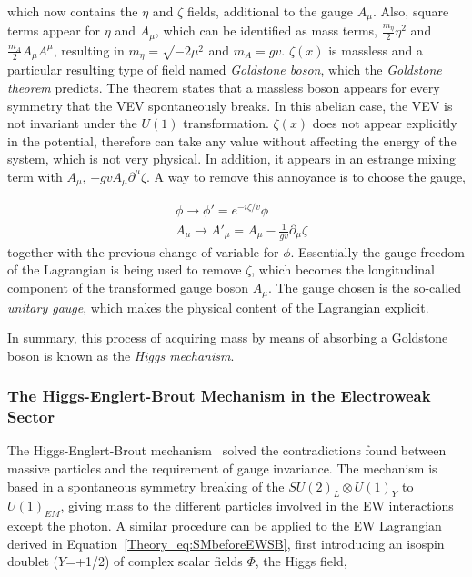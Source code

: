 which now contains the $\eta$ and $\zeta$ fields, additional to the gauge $A_\mu$. Also, square terms appear for $\eta$ and $A_\mu$, which can be identified as mass terms, $\frac{m_\eta}{2}\eta^2$ and $\frac{m_A}{2}A_\mu A^\mu$, resulting in $m_\eta=\sqrt{-2\mu^2}$ and $m_A=gv$. $\zeta(x)$ is massless and a particular resulting type of field named \textit{Goldstone boson}, which the \textit{Goldstone theorem} predicts. The theorem states that a massless boson appears for every symmetry that the VEV spontaneously breaks. In this abelian case, the VEV is not invariant under the $U(1)$ transformation. $\zeta(x)$ does not appear explicitly in the potential, therefore can take any value without affecting the energy of the system, which is not very physical. In addition, it appears in an estrange mixing term with $A_\mu$, $-gvA_\mu\partial^\mu\zeta$. A way to remove this annoyance is to choose the gauge,

\begin{equation}
\begin{split}
    &\phi\rightarrow\phi'=e^{-i\zeta/v}\phi \\
    &A_\mu\rightarrow A'_\mu = A_\mu-\frac{1}{gv}\partial_\mu\zeta
\end{split}
\end{equation}
together with the previous change of variable for $\phi$. Essentially the gauge freedom of the Lagrangian is being used to remove $\zeta$, which becomes the longitudinal component of the transformed gauge boson $A_\mu$. The gauge chosen is the so-called \textit{unitary gauge}, which makes the physical content of the Lagrangian explicit.

In summary, this process of acquiring mass by means of absorbing a Goldstone boson is known as the \textit{Higgs mechanism}.

\subsubsection{The Higgs-Englert-Brout Mechanism in the Electroweak Sector}

The Higgs-Englert-Brout mechanism~\cite{Higgs1,Higgs2,Englert} solved the contradictions found between massive particles and the requirement of gauge invariance. The mechanism is based in a spontaneous symmetry breaking of the $SU(2)_L\otimes U(1)_Y$ to $U(1)_{EM}$, giving mass to the different particles involved in the EW interactions except the photon. A similar procedure can be applied to the EW Lagrangian derived in Equation~\ref{Theory_eq:SMbeforeEWSB}, first introducing an isospin doublet ($Y$=+1/2) of complex scalar fields $\Phi$, the Higgs field,

